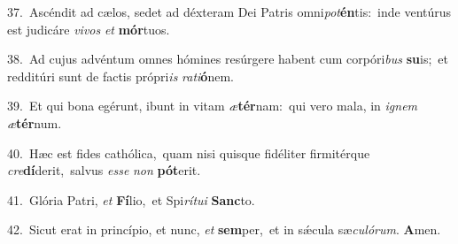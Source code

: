 {\numbfont\textcolor{\numbcolor}{37.}}~Ascéndit ad cælos, sedet ad déxteram Dei Patris omni\-\textit{pot}\-\textbf{én}tis:~\star inde ventúrus est judicáre \textit{vi}\-\textit{vos} \textit{et} \textbf{mór}\-tuos.\par
{\numbfont\textcolor{\numbcolor}{38.}}~Ad cujus advéntum omnes hómines resúrgere habent cum corpóri\textit{bus} \textbf{su}\-is;~\star et redditúri sunt de factis própri\textit{is} \textit{ra}\-\textit{ti}\textbf{ó}nem.\par
{\numbfont\textcolor{\numbcolor}{39.}}~Et qui bona egérunt, ibunt in vitam \textit{æ}\-\textbf{tér}nam:~\star qui vero mala, in \textit{i}\-\textit{gnem} \textit{æ}\-\textbf{tér}num.\par
{\numbfont\textcolor{\numbcolor}{40.}}~Hæc est fides cathólica,~\dagger quam nisi quisque fidéliter firmitérque \textit{cre}\-\textbf{dí}derit,~\star salvus \textit{es}\-\textit{se} \textit{non} \textbf{pót}\-erit.\par
{\numbfont\textcolor{\numbcolor}{41.}}~Glória Patri, \textit{et} \textbf{Fí}\-lio,~\star et Spi\-\textit{rí}\-\textit{tu}\textit{i} \textbf{Sanc}\-to.\par
{\numbfont\textcolor{\numbcolor}{42.}}~Sicut erat in princípio, et nunc, \textit{et} \textbf{sem}\-per,~\star et in sǽcula sæ\-\textit{cu}\-\textit{ló}\textit{rum}. \textbf{A}\-men.\par
